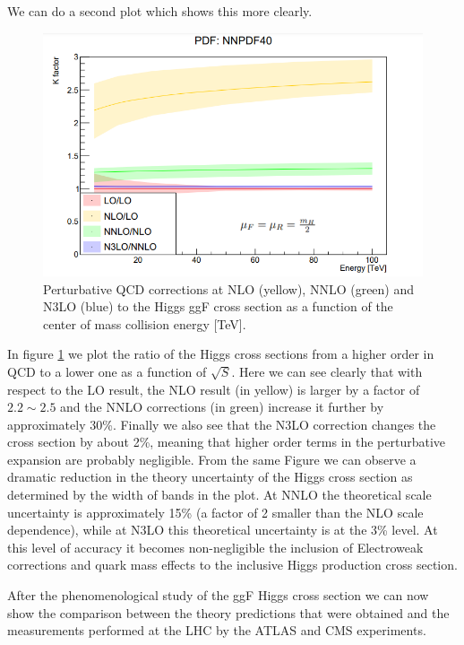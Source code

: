 \documentclass[EPJ,twocolumn]{webofc}
\begin{document}
We can do a second plot which shows this more clearly.

\begin{figure}[ht]
    \centering
    \includegraphics[width=.8\columnwidth]{Images/NNPDF40K.png}
    \caption{Perturbative QCD corrections at NLO (yellow), NNLO (green) and N3LO (blue) to the Higgs ggF cross section as a function of the center of mass collision energy [TeV]. }
    \label{results2}
\end{figure}


In figure \ref{results2} we plot the ratio of the Higgs cross sections from a higher order in QCD to a lower one as a function of $\sqrt{S}$. Here we can see clearly that with respect to the LO result, the NLO result (in yellow) is larger by a factor of $2.2\sim2.5$ and the NNLO corrections (in green) increase it further by approximately 30\%. Finally we also see that the N3LO correction changes the cross section by about 2\%, meaning that higher order terms in the perturbative expansion are probably negligible. From the same Figure we can observe a dramatic reduction in the theory uncertainty of the Higgs cross section as determined by the width of bands in the plot. At NNLO the theoretical scale uncertainty is approximately 15\% (a factor of 2 smaller than the NLO scale dependence), while at N3LO this theoretical uncertainty is at the 3\% level.  At this level of accuracy it becomes non-negligible the inclusion of Electroweak corrections and quark mass effects to the inclusive Higgs production cross section.


After the phenomenological study of the ggF Higgs cross section we can now show the comparison between the theory predictions that were obtained and the measurements performed at the LHC by the ATLAS\cite{ATLAS:2019nkf} and CMS\cite{CMS:2021ugl} experiments.
\end{document}
